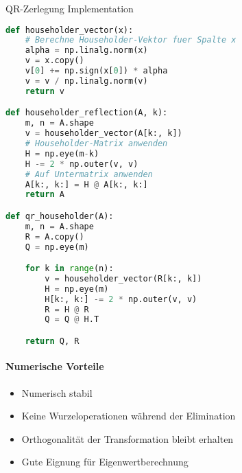 \begin{examplecode}{QR-Zerlegung Implementation}
\begin{lstlisting}[language=Python, style=basesmol]
def householder_vector(x):
    # Berechne Householder-Vektor fuer Spalte x
    alpha = np.linalg.norm(x)
    v = x.copy()
    v[0] += np.sign(x[0]) * alpha
    v = v / np.linalg.norm(v)
    return v

def householder_reflection(A, k):
    m, n = A.shape
    v = householder_vector(A[k:, k])
    # Householder-Matrix anwenden
    H = np.eye(m-k)
    H -= 2 * np.outer(v, v)
    # Auf Untermatrix anwenden
    A[k:, k:] = H @ A[k:, k:]
    return A

def qr_householder(A):
    m, n = A.shape
    R = A.copy()
    Q = np.eye(m)

    for k in range(n):
        v = householder_vector(R[k:, k])
        H = np.eye(m)
        H[k:, k:] -= 2 * np.outer(v, v)
        R = H @ R
        Q = Q @ H.T

    return Q, R
\end{lstlisting}

\paragraph{Numerische Vorteile}
\begin{itemize}
    \item Numerisch stabil
    \item Keine Wurzeloperationen während der Elimination
    \item Orthogonalität der Transformation bleibt erhalten
    \item Gute Eignung für Eigenwertberechnung
\end{itemize}
\end{examplecode}

